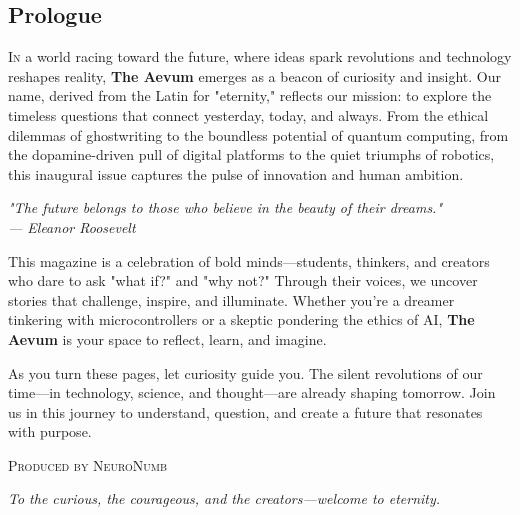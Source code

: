 \documentclass[a4paper,10pt,twocolumn]{memoir}
\newenvironment{magquote}
  {\begin{shaded*}\itshape\small}
  {\end{shaded*}}
\begin{document}
\begin{titlingpage}
\thispagestyle{empty}

\noindent
\begin{minipage}[t]{0.45\textwidth}
\section*{\centering\large\bfseries\color{primary}Prologue}
\vspace{0.5cm}
\vspace{0.5cm}

\lettrine[lines=3]{I}{n} a world racing toward the future, where ideas spark revolutions and technology reshapes reality, \textbf{The Aevum} emerges as a beacon of curiosity and insight. Our name, derived from the Latin for "eternity," reflects our mission: to explore the timeless questions that connect yesterday, today, and always. From the ethical dilemmas of ghostwriting to the boundless potential of quantum computing, from the dopamine-driven pull of digital platforms to the quiet triumphs of robotics, this inaugural issue captures the pulse of innovation and human ambition.

\begin{center}
\begin{magquote}
"The future belongs to those who believe in the beauty of their dreams." \\
\hfill --- Eleanor Roosevelt
\end{magquote}
\end{center}

This magazine is a celebration of bold minds---students, thinkers, and creators who dare to ask "what if?" and "why not?" Through their voices, we uncover stories that challenge, inspire, and illuminate. Whether you're a dreamer tinkering with microcontrollers or a skeptic pondering the ethics of AI, \textbf{The Aevum} is your space to reflect, learn, and imagine.

As you turn these pages, let curiosity guide you. The silent revolutions of our time---in technology, science, and thought---are already shaping tomorrow. Join us in this journey to understand, question, and create a future that resonates with purpose.

\vspace{0.3cm}
\begin{flushright}
{\small\scshape\color{gray}Produced by NeuroNumb}
\end{flushright}
\vspace*{\fill}
\begin{center}
   {\large\itshape\color{dark}To the curious, the courageous, and the creators---welcome to eternity.}
\end{center}
\end{minipage}
\hfill
\begin{minipage}[t]{0.45\textwidth}

\end{minipage}
\end{titlingpage}
\end{document}
